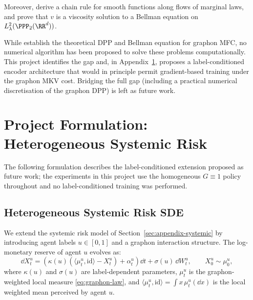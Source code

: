 \documentclass[11pt]{article}
\begin{document}
Moreover, \citet{decrescenzo2025mfc} derive a chain rule for smooth functions along flows of marginal laws, and prove that $v$ is a viscosity solution to a Bellman equation on $L^2_\lambda(\PPP_2(\RR^d))$.

\begin{remark}
  While \citet{decrescenzo2025mfc} establish the theoretical DPP and Bellman equation for graphon MFC, no numerical algorithm has been proposed to solve these problems computationally. This project identifies the gap and, in Appendix~\ref{sec:appendix-formulation}, proposes a label-conditioned encoder architecture that would in principle permit gradient-based training under the graphon MKV cost. Bridging the full gap (including a practical numerical discretisation of the graphon DPP) is left as future work.
\end{remark}


\section{Project Formulation: Heterogeneous Systemic Risk}\label{sec:appendix-formulation}

The following formulation describes the label-conditioned extension proposed as future work; the experiments in this project use the homogeneous $G \equiv 1$ policy throughout and no label-conditioned training was performed.

\subsection{Heterogeneous Systemic Risk SDE}

We extend the systemic risk model of Section~\ref{sec:appendix-systemic} by introducing agent labels $u \in [0,1]$ and a graphon interaction structure. The log-monetary reserve of agent $u$ evolves as:
\begin{equation}\label{eq:hetero-sde}
  \dd X_t^u = \left(\kappa(u)\left(\langle \mu_t^u, \mathrm{id}\rangle - X_t^u\right) + \alpha_t^u\right)\dd t + \sigma(u)\,\dd W_t^u, \qquad X_0^u \sim \mu_0^u,
\end{equation}
where $\kappa(u)$ and $\sigma(u)$ are label-dependent parameters, $\mu_t^u$ is the graphon-weighted local measure \eqref{eq:graphon-law}, and $\langle \mu_t^u, \mathrm{id} \rangle = \int x\,\mu_t^u(\dd x)$ is the local weighted mean perceived by agent $u$.
\end{document}
